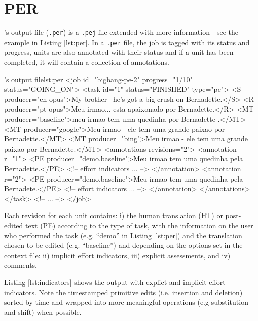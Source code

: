 \section{PER}

\PET's output file ({\tt .per}) is a {\tt .pej} file extended with more information - see the example in Listing \ref{lst:per}.
In a {\tt .per} file, the job is tagged with its status and progress, units are also annotated with their status and if a unit has been completed, it will contain a collection of annotations.

\begin{workflow-code}{\PET's output file}{lst:per}
<job id="bigbang-pe-2" progress="1/10" status="GOING_ON">
	<task id="1" status="FINISHED" type="pe">
	<S producer="en-opus">My brother-- he's got a big crush on Bernadette.</S>
	<R producer="pt-opus">Meu irmao... esta apaixonado por Bernadette.</R>
	<MT producer="baseline">meu irmao tem uma quedinha por Bernadette .</MT>
	<MT producer="google">Meu irmao - ele tem uma grande paixao por Bernadette.</MT>
	<MT producer="bing">Meu irmao - ele tem uma grande paixao por Bernadette.</MT>
	<annotations revisions="2">
		<annotation r="1">
			<PE producer="demo.baseline">Meu irmao tem uma quedinha pela Bernadette.</PE>
			<!-- effort indicators ... -->
		</annotation>
		<annotation r="2">
			<PE producer="demo.baseline">Meu irmao tem uma quedinha pela Bernadete.</PE>
			<!-- effort indicators ... -->
		</annotation>
	</annotations>
	</task>
	<!-- ... -->
</job>
\end{workflow-code}

Each revision for each unit contains: i) the human translation (HT) or post-edited text (PE) according to the type of task, with the information on the user who performed the task (e.g. ``demo'' in Listing \ref{lst:per}) and the translation chosen to be edited (e.g. ``baseline'') and depending on the options set in the context file: ii) implicit effort indicators, iii) explicit assessments, and iv) comments.

Listing \ref{lst:indicators} shows the output with explict and implicit effort indicators. Note the timestamped primitive edits (i.e. insertion and deletion) sorted by time and wrapped into more meaningful operations (e.g substitution and shift) when possible.

